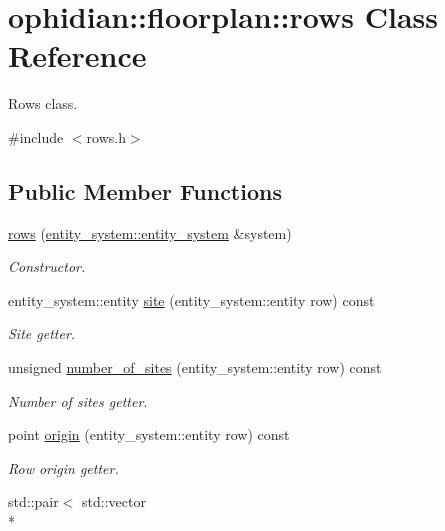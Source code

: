 \hypertarget{classophidian_1_1floorplan_1_1rows}{\section{ophidian\-:\-:floorplan\-:\-:rows Class Reference}
\label{classophidian_1_1floorplan_1_1rows}
}


Rows class.  




{\ttfamily \#include $<$rows.\-h$>$}

\subsection*{Public Member Functions}
\begin{DoxyCompactItemize}
\item 
\hyperlink{classophidian_1_1floorplan_1_1rows_aba20b49ee207951c80d642be86c5952f}{rows} (\hyperlink{classophidian_1_1entity__system_1_1entity__system}{entity\-\_\-system\-::entity\-\_\-system} \&system)
\begin{DoxyCompactList}\small\item\em Constructor. \end{DoxyCompactList}\item 
entity\-\_\-system\-::entity \hyperlink{classophidian_1_1floorplan_1_1rows_a0033645e8ad53594e5c9561828a11ab2}{site} (entity\-\_\-system\-::entity row) const 
\begin{DoxyCompactList}\small\item\em Site getter. \end{DoxyCompactList}\item 
unsigned \hyperlink{classophidian_1_1floorplan_1_1rows_a5ab64430f2fd168e26cfcff2972995fe}{number\-\_\-of\-\_\-sites} (entity\-\_\-system\-::entity row) const 
\begin{DoxyCompactList}\small\item\em Number of sites getter. \end{DoxyCompactList}\item 
point \hyperlink{classophidian_1_1floorplan_1_1rows_a5698f73fa4f6412abc61d32b58899641}{origin} (entity\-\_\-system\-::entity row) const 
\begin{DoxyCompactList}\small\item\em Row origin getter. \end{DoxyCompactList}\item 
std\-::pair$<$ std\-::vector\\*

\end{DoxyCompactItemize}
